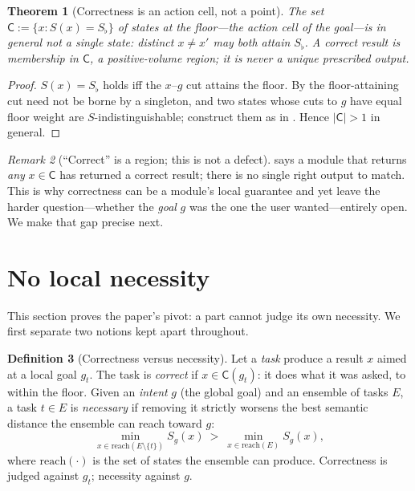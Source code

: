 \documentclass[twocolumn,11pt,a4paper]{article}
\theoremstyle{sup}
\newtheorem{theorem}{Theorem}[section]
\theoremstyle{definition}
\newtheorem{definition}[theorem]{Definition}
\theoremstyle{remark}
\newtheorem{remark}[theorem]{Remark}
\newcommand{\reach}{\mathrm{reach}}   %
\newcommand{\Sent}{S}                 %
\newcommand{\Sflat}{S_{\flat}}        %
\newcommand{\cell}{\mathsf{C}}        %
\newcommand{\task}{t}
\newcommand{\Ens}{E}                  %
\newcommand{\abs}[1]{\lvert#1\rvert}
\newcommand{\set}[1]{\{#1\}}
\begin{document}
\begin{theorem}[Correctness is an action cell, not a point]
\label{thm:cell}
The set $\cell:=\set{x:\Sent(x)=\Sflat}$ of states at the floor---the
\emph{action cell} of the goal---is in general not a single state: distinct $x\neq
x'$ may both attain $\Sflat$. A correct result is membership in $\cell$, a
positive-volume region; it is never a unique prescribed output.
\end{theorem}

\begin{proof}
$\Sent(x)=\Sflat$ holds iff the $x$--$g$ cut attains the floor. By
 the floor-attaining cut need not be borne by a singleton, and
two states whose cuts to $g$ have equal floor weight are $\Sent$-indistinguishable;
construct them as in . Hence $\abs{\cell}>1$ in general.
\end{proof}

\begin{remark}[``Correct'' is a region; this is not a defect]
\label{rem:cell}
 says a module that returns \emph{any} $x\in\cell$ has returned a
correct result; there is no single right output to match. This is why correctness
can be a module's local guarantee and yet leave the harder question---whether the
\emph{goal} $g$ was the one the user wanted---entirely open. We make that gap
precise next.
\end{remark}

\section{No local necessity}
\label{sec:nolocal}

This section proves the paper's pivot: a part cannot judge its own necessity. We
first separate two notions kept apart throughout.

\begin{definition}[Correctness versus necessity]
\label{def:corr-nec}
Let a \emph{task} produce a result $x$ aimed at a local goal $g_\task$. The task
is \emph{correct} if $x\in\cell(g_\task)$: it does what it was asked, to within
the floor. Given an \emph{intent} $g$ (the global goal) and an ensemble of tasks
$\Ens$, a task $\task\in\Ens$ is \emph{necessary} if removing it strictly worsens
the best semantic distance the ensemble can reach toward $g$:
\[
\min_{x\in\reach(\Ens\setminus\set\task)}\Sent_g(x)\ >\
\min_{x\in\reach(\Ens)}\Sent_g(x),
\]
where $\reach(\cdot)$ is the set of states the ensemble can produce. Correctness
is judged against $g_\task$; necessity against $g$.
\end{definition}
\end{document}
